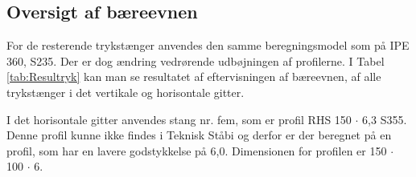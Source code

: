 \subsection{Oversigt af bæreevnen}
For de resterende trykstænger anvendes den samme beregningsmodel som på IPE 360, S235. Der er dog ændring vedrørende udbøjningen af profilerne. I Tabel \ref{tab:Resultryk} kan man se resultatet af eftervisningen af bæreevnen, af alle trykstænger i det vertikale og horisontale gitter. 

I det horisontale gitter anvendes stang nr. fem, som er profil RHS 150 $ \cdot$ 6,3 S355. Denne profil kunne ikke findes i Teknisk Ståbi \citep{TekniskStobi} og derfor er der beregnet på en profil, som har en lavere godstykkelse på 6,0. Dimensionen for profilen er 150 $\cdot$ 100 $\cdot $ 6.

\begin{table}[H]
\centering
{}
\caption{Tabel over resultatet over trykstænger i det vertikale og horisontale gitter.}
\label{tab:Resultryk}
\end{table}

